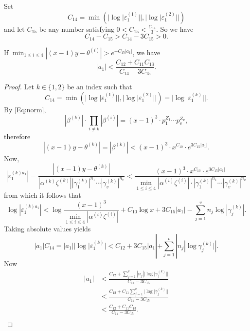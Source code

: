 Set 
\[C_{14} = \min \left( |\log|\varepsilon_1^{(1)}||, |\log|\varepsilon_1^{(2)}||\right)\]
and let $C_{15}$ be any number satisfying $0 < C_{15} < \frac{C_{14}}{3}$.
So we have 
\[C_{14} - C_{15} > C_{14} - 3C_{15} > 0.\]

\begin{lemma}
If $\displaystyle \min_{1\leq i \leq 4}|(x-1)y-\theta^{(i)}| > e^{-C_{15}|a_1|}$, we have
\[|a_1|<  \frac{C_{12} + C_{11}C_{13}}{C_{14} - 3C_{15}} .\]
\end{lemma}

\begin{proof}
Let $k \in \{1,2\}$ be an index such that 
\[C_{14} = \min \left( |\log|\varepsilon_1^{(1)}||, |\log|\varepsilon_1^{(2)}||\right) = |\log|\varepsilon_1^{(k)}||. \]
By \eqref{Eq:norm}, 
\[|\beta^{(k)}| \cdot \prod_{i \neq k}|\beta^{(i)}| = (x-1)^3\cdot p_1^{Z_1}\cdots p_v^{Z_v}, \]
therefore
\[|(x-1)y-\theta^{(k)}| = |\beta^{(k)}| < (x-1)^3\cdot x^{C_{10}} \cdot e^{3C_{15}|a_1|}.\]
Now, 
\[|\varepsilon_1^{(k)a_1}|
= \frac{|(x-1)y-\theta^{(k)}|}{|\alpha^{(k)}\zeta^{(k)}||\gamma_1^{(k)}|^{n_1}\cdots |\gamma_v^{(k)}|^{n_v}}
< \frac{(x-1)^3\cdot x^{C_{10}} \cdot e^{3C_{15}|a_1|}}{\displaystyle \min_{1\leq i \leq 4}|\alpha^{(i)}\zeta^{(i)}| 		\cdot |\gamma_1^{(k)}|^{n_1}\cdots |\gamma_v^{(k)}|^{n_v}}\]
from which it follows that
\[\log|\varepsilon_1^{(k)a_1}| 
< \log{\frac{(x-1)^3}{\displaystyle \min_{1\leq i \leq 4}|\alpha^{(i)}\zeta^{(i)}|}} +  C_{10}\log{x} + 3C_{15}|a_1|- \sum_{j = 1}^v n_j \log|\gamma_j^{(k)}|.\]
Taking absolute values yields
\[|a_1|C_{14} = |a_1| |\log|\varepsilon_1^{(k)}| < C_{12} + 3C_{15}|a_1| + \sum_{j = 1}^v |n_j|\log{\gamma_j^{(k)}|}|.\]
Now
\[\begin{split}
|a_1| 
& < \frac{C_{12} +\displaystyle\sum_{j = 1}^v |n_j||\log|\gamma_j^{(k)}||}{C_{14} - 3C_{15}}\\
& < \frac{C_{12} +C_{11}\displaystyle\sum_{j = 1}^v |\log|\gamma_j^{(k)}||}{C_{14} - 3C_{15}}\\
& < \frac{C_{12} +C_{11}C_{13}}{C_{14} - 3C_{15}}.\\
\end{split}\]


\end{proof}
